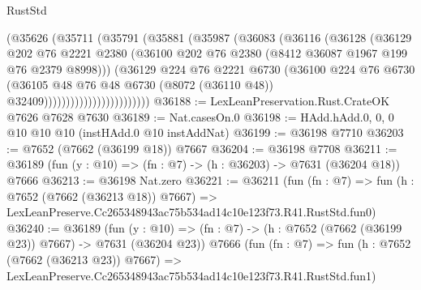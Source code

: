 \begin{lexlean}{RustStd}
\begin{coremodule}
                              (@35626
                                (@35711
                                  (@35791
                                    (@35881
                                      (@35987
                                        (@36083
                                          (@36116
                                            (@36128
                                              (@36129
                                                @202
                                                @76
                                                @2221
                                                @2380
                                                (@36100
                                                  @202
                                                  @76
                                                  @2380
                                                  (@8412 @36087 @1967 @199 @76 @2379 @8998)))
                                              (@36129
                                                @224
                                                @76
                                                @2221
                                                @6730
                                                (@36100
                                                  @224
                                                  @76
                                                  @6730
                                                  (@36105
                                                    @48
                                                    @76
                                                    @48
                                                    @6730
                                                    (@8072 (@36110 @48))
                                                    @32409))))))))))))))))))))))))
@36188 := LexLeanPreservation.Rust.CrateOK @7626 @7628 @7630
@36189 := Nat.casesOn.{0}
@36198 := HAdd.hAdd.{0, 0, 0} @10 @10 @10 (instHAdd.{0} @10 instAddNat)
@36199 := @36198 @7710
@36203 := @7652 (@7662 (@36199 @18)) @7667
@36204 := @36198 @7708
@36211 := @36189 (fun (y : @10) => (fn : @7) -> (h : @36203) -> @7631 (@36204 @18)) @7666
@36213 := @36198 Nat.zero
@36221 := @36211
    (fun (fn : @7) =>
    fun (h : @7652 (@7662 (@36213 @18)) @7667) =>
    LexLeanPreserve.Cc265348943ac75b534ad14c10e123f73.R41.RustStd.fun0)
@36240 := @36189
    (fun (y : @10) => (fn : @7) -> (h : @7652 (@7662 (@36199 @23)) @7667) -> @7631 (@36204 @23))
    @7666
    (fun (fn : @7) =>
    fun (h : @7652 (@7662 (@36213 @23)) @7667) =>
    LexLeanPreserve.Cc265348943ac75b534ad14c10e123f73.R41.RustStd.fun1)

\end{coremodule}
\end{lexlean}

